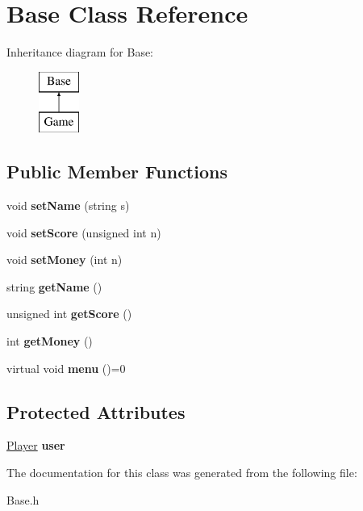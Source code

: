 \hypertarget{class_base}{}\section{Base Class Reference}
\label{class_base}
Inheritance diagram for Base\+:\begin{figure}[H]
\begin{center}
\leavevmode
\includegraphics[height=2.000000cm]{class_base}
\end{center}
\end{figure}
\subsection*{Public Member Functions}
\begin{DoxyCompactItemize}
\item 
\hypertarget{class_base_ab7b786b5f6fc4a9107d74ab775f690c8}{}\label{class_base_ab7b786b5f6fc4a9107d74ab775f690c8} 
void {\bfseries set\+Name} (string s)
\item 
\hypertarget{class_base_a093730093bb033b15c88fab3543946a4}{}\label{class_base_a093730093bb033b15c88fab3543946a4} 
void {\bfseries set\+Score} (unsigned int n)
\item 
\hypertarget{class_base_a6928c218ba6fd96b624a6a6e1596a182}{}\label{class_base_a6928c218ba6fd96b624a6a6e1596a182} 
void {\bfseries set\+Money} (int n)
\item 
\hypertarget{class_base_a0eb186c3531a995a2c5604f1bc50b9a9}{}\label{class_base_a0eb186c3531a995a2c5604f1bc50b9a9} 
string {\bfseries get\+Name} ()
\item 
\hypertarget{class_base_a6aae29ab6c4641d881350c637c139595}{}\label{class_base_a6aae29ab6c4641d881350c637c139595} 
unsigned int {\bfseries get\+Score} ()
\item 
\hypertarget{class_base_a486bab6c7be402e9d611380312c35629}{}\label{class_base_a486bab6c7be402e9d611380312c35629} 
int {\bfseries get\+Money} ()
\item 
\hypertarget{class_base_a80a8d1bf23dad9bd4ee5c03a7570a68d}{}\label{class_base_a80a8d1bf23dad9bd4ee5c03a7570a68d} 
virtual void {\bfseries menu} ()=0
\end{DoxyCompactItemize}
\subsection*{Protected Attributes}
\begin{DoxyCompactItemize}
\item 
\hypertarget{class_base_a39222e97772fce1ff55250028e93ddbd}{}\label{class_base_a39222e97772fce1ff55250028e93ddbd} 
\hyperlink{struct_player}{Player} {\bfseries user}
\end{DoxyCompactItemize}


The documentation for this class was generated from the following file\+:\begin{DoxyCompactItemize}
\item 
Base.\+h\end{DoxyCompactItemize}
